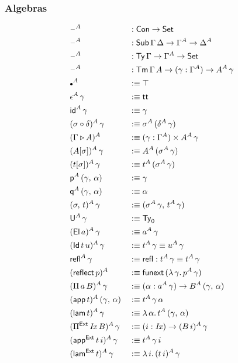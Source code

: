 \documentclass[12pt,a4paper,twoside,openany]{book}
\theoremstyle{remark}
\theoremstyle{definition}
\theoremstyle{theorem}
\newcommand{\mi}[1]{\mathit{#1}}
\newcommand{\ms}[1]{\mathsf{#1}}
\newcommand{\funext}{\ms{funext}}
\newcommand{\refl}{\mathsf{refl}}
\newcommand{\reflect}{\mathsf{reflect}}
\newcommand{\id}{\mathsf{id}}
\newcommand{\Con}{\mathsf{Con}}
\newcommand{\Sub}{\mathsf{Sub}}
\newcommand{\Tm}{\mathsf{Tm}}
\newcommand{\Ty}{\mathsf{Ty}}
\newcommand{\U}{\mathsf{U}}
\newcommand{\El}{\mathsf{El}}
\newcommand{\Id}{\mathsf{Id}}
\renewcommand{\tt}{\mathsf{tt}}
\newcommand{\blank}{\mathord{\hspace{1pt}\text{--}\hspace{1pt}}}
\newcommand{\Set}{\mathsf{Set}}
\newcommand{\ext}{\triangleright}
\newcommand{\emptycon}{\scaleobj{.75}\bullet}
\newcommand{\Pie}{\Pi^{\mathsf{Ext}}}
\newcommand{\appe}{\mathsf{app^{Ext}}}
\newcommand{\lame}{\mathsf{lam^{Ext}}}
\newcommand{\p}{\mathsf{p}}
\newcommand{\q}{\mathsf{q}}
\newcommand{\app}{\ms{app}}
\newcommand{\lam}{\ms{lam}}
\newcommand{\defn}{:\equiv}
\begin{document}
\subsubsection{Algebras}

\begin{alignat*}{3}
  &\blank^A &&: \Con \to \Set\\
  &\blank^A &&: \Sub\,\Gamma\,\Delta \to \Gamma^A \to \Delta^A\\
  &\blank^A &&: \Ty\,\Gamma \to \Gamma^A \to \Set\\
  &\blank^A &&: \Tm\,\Gamma\,A \to (\gamma : \Gamma^A) \to A^A\,\gamma\\
  &\emptycon^A &&\defn \top\\
  &\epsilon^A\,\gamma &&\defn \tt\\
  &\id^A\,\gamma &&\defn \gamma\\
  &(\sigma \circ \delta)^A\,\gamma &&\defn \sigma^A\,(\delta^A\,\gamma)\\
  &(\Gamma \ext A)^A &&\defn (\gamma : \Gamma^A) \times A^A\,\gamma\\
  &(A[\sigma])^A\,\gamma &&\defn A^A\,(\sigma^A\,\gamma)\\
  &(t[\sigma])^A\,\gamma &&\defn t^A\,(\sigma^A\,\gamma)\\
  &\p^A\,(\gamma,\,\alpha) &&\defn \gamma\\
  &\q^A\,(\gamma,\,\alpha) &&\defn \alpha\\
  &(\sigma,\,t)^A\,\gamma &&\defn (\sigma^A\,\gamma,\,t^A\,\gamma)\\
  &\U^A\,\gamma &&\defn \Ty_0\\
  &(\El\,a)^A\,\gamma &&\defn a^A\,\gamma\\
  &(\Id\,t\,u)^A\,\gamma &&\defn t^A\,\gamma \equiv u^A\,\gamma\\
  &\refl^A\,\gamma &&\defn \refl : t^A\,\gamma \equiv t^A\,\gamma\\
  &(\reflect\,p)^A &&\defn \funext\,(\lambda\,\gamma.\,p^A\,\gamma)\\
  &(\Pi\,a\,B)^A\,\gamma &&\defn (\alpha : a^A\,\gamma) \to B^A\,(\gamma,\,\alpha)\\
  &(\app\,t)^A\,(\gamma,\,\alpha) &&\defn t^A\,\gamma\,\alpha\\
  &(\lam\,t)^A\,\gamma &&\defn \lambda\,\alpha.\,t^A\,(\gamma,\,\alpha)\\
  &(\Pie\,\mi{Ix}\,B)^A\,\gamma &&\defn (i : \mi{Ix}) \to (B\,i)^A\,\gamma\\
  &(\appe\,t\,i)^A\,\gamma &&\defn t^A\,\gamma\,i\\
  &(\lame\,t)^A\,\gamma &&\defn \lambda\,i.\,(t\,i)^A\,\gamma
\end{alignat*}
\end{document}
